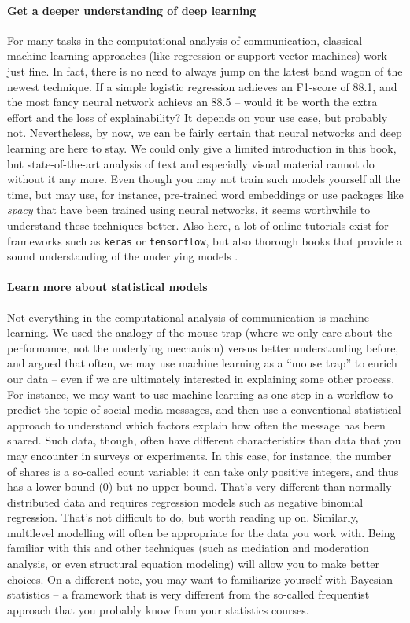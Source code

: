 \paragraph{Get a deeper understanding of deep learning} For many tasks in the computational analysis of communication, classical machine learning approaches (like regression or support vector machines) work just fine. In fact, there is no need to always jump on the latest band wagon of the newest technique. If a simple logistic regression achieves an F1-score of 88.1, and the most fancy neural network achievs an 88.5 -- would it be worth the extra effort and the loss of explainability? It depends on your use case, but probably not. Nevertheless, by now, we can be fairly certain that neural networks and deep learning are here to stay. We could only give a limited introduction in this book, but state-of-the-art analysis of text and especially visual material cannot do without it any more. Even though you may not train such models yourself all the time, but may use, for instance, pre-trained word embeddings or use packages like \emph{spacy} that have been trained using neural networks, it seems worthwhile to understand these techniques better. Also here, a lot of online tutorials exist for frameworks such as \texttt{keras} or \texttt{tensorflow}, but also thorough books that provide a sound understanding of the underlying models \cite{goldberg2017}.


\paragraph{Learn more about statistical models} Not everything in the computational analysis of communication is machine learning. We used the analogy of the mouse trap (where we only care about the performance, not the underlying mechanism) versus better understanding before, and argued that often, we may use machine learning as a ``mouse trap'' to enrich our data -- even if we are ultimately interested in explaining some other process. For instance, we may want to use machine learning as one step in a workflow to predict the topic of social media messages, and then use a conventional statistical approach to understand which factors explain how often the message has been shared. Such data, though, often have different characteristics than data that you may encounter in surveys or experiments. In this case, for instance, the number of shares is a so-called count variable: it can take only positive integers, and thus has a lower bound (0) but no upper bound. That's very different than normally distributed data and requires regression models such as negative binomial regression. That's not difficult to do, but worth  reading up on. Similarly, multilevel modelling will often be appropriate for the data you work with. Being familiar with this and other techniques (such as mediation and moderation analysis, or even structural equation modeling) will allow you to make better choices. On a different note, you may want to familiarize yourself with Bayesian statistics -- a framework that is very different from the so-called frequentist approach that you probably know from your statistics courses.


